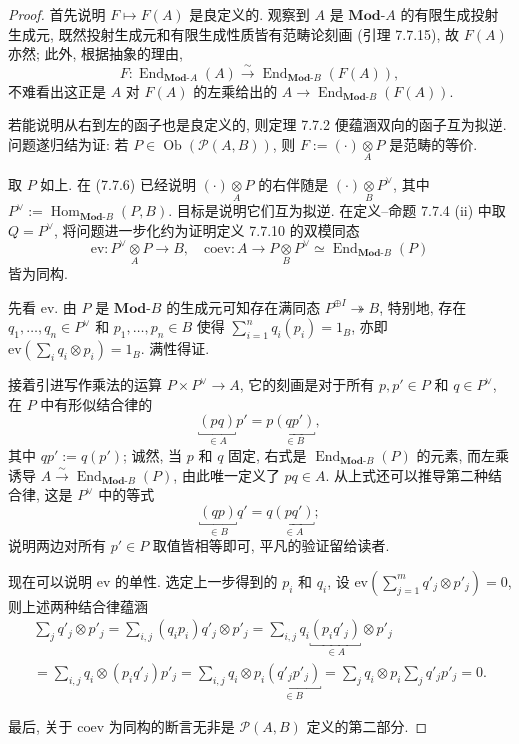 \documentclass[11pt]{article}
\newcommand{\Obj}{\operatorname{Ob}}
\newcommand{\Hom}{\operatorname{Hom}}
\newcommand{\End}{\operatorname{End}}
\newcommand{\cated}[1]{\mathbf{#1}\text{-}}
\newcommand{\dotimes}[1]{\mathbin{\mathop{\otimes}\limits_{#1}}}
\newcommand{\rightiso}{\xrightarrow{\sim}}
\theoremstyle{definition}
\begin{document}
\begin{proof}
	首先说明 $F \mapsto F(A)$ 是良定义的. 观察到 $A$ 是 $\cated{Mod}A$ 的有限生成投射生成元, 既然投射生成元和有限生成性质皆有范畴论刻画 (引理 7.7.15), 故 $F(A)$ 亦然; 此外, 根据抽象的理由,
	\[ F: \End_{\cated{Mod}A}(A) \rightiso \End_{\cated{Mod}B}(F(A)), \]
	不难看出这正是 $A$ 对 $F(A)$ 的左乘给出的 $A \to \End_{\cated{Mod}B}(F(A))$.
	
	若能说明从右到左的函子也是良定义的, 则定理 7.7.2 便蕴涵双向的函子互为拟逆. 问题遂归结为证: 若 $P \in \Obj(\mathcal{P}(A, B))$, 则 $F := (\cdot) \dotimes{A} P$ 是范畴的等价.
	
	取 $P$ 如上. 在 (7.7.6) 已经说明 $(\cdot) \dotimes{A} P$ 的右伴随是 $(\cdot) \dotimes{B} P^\vee$, 其中 $P^\vee := \Hom_{\cated{Mod}B}(P, B)$. 目标是说明它们互为拟逆. 在定义--命题 7.7.4 (ii) 中取 $Q = P^\vee$, 将问题进一步化约为证明定义 7.7.10 的双模同态
	\[ \mathrm{ev}: P^\vee \dotimes{A} P \to B, \quad \mathrm{coev}: A \to P \dotimes{B} P^\vee \simeq \End_{\cated{Mod}B}(P) \]
	皆为同构.
	
	先看 $\mathrm{ev}$. 由 $P$ 是 $\cated{Mod}B$ 的生成元可知存在满同态 $P^{\oplus I} \twoheadrightarrow B$, 特别地, 存在 $q_1, \ldots, q_n \in P^\vee$ 和 $p_1, \ldots, p_n \in B$ 使得 $\sum_{i=1}^n q_i(p_i) = 1_B$, 亦即 $\mathrm{ev}(\sum_i q_i \otimes p_i) = 1_B$. 满性得证.
	
	接着引进写作乘法的运算 $P \times P^\vee \to A$, 它的刻画是对于所有 $p, p' \in P$ 和 $q \in P^\vee$, 在 $P$ 中有形似结合律的
	\[ \underbracket{(pq)}_{\in A} p' = p \underbracket{(qp')}_{\in B}, \]
	其中 $qp' := q(p')$; 诚然, 当 $p$ 和 $q$ 固定, 右式是 $\End_{\cated{Mod}B}(P)$ 的元素, 而左乘诱导 $A \rightiso \End_{\cated{Mod}B}(P)$, 由此唯一定义了 $pq \in A$. 从上式还可以推导第二种结合律, 这是 $P^\vee$ 中的等式
	\[ \underbracket{(qp)}_{\in B} q' = q \underbracket{(pq')}_{\in A}; \]
	说明两边对所有 $p' \in P$ 取值皆相等即可, 平凡的验证留给读者.

	现在可以说明 $\mathrm{ev}$ 的单性. 选定上一步得到的 $p_i$ 和 $q_i$, 设 $\mathrm{ev}(\sum_{j=1}^m q'_j \otimes p'_j) = 0$, 则上述两种结合律蕴涵
	\begin{multline*}
		\sum_j q'_j \otimes p'_j = \sum_{i, j} (q_i p_i) q'_j \otimes p'_j
		= \sum_{i, j} q_i \underbracket{(p_i q'_j)}_{\in A} \otimes p'_j \\
		= \sum_{i, j} q_i \otimes (p_i q'_j) p'_j
		= \sum_{i, j} q_i \otimes p_i \underbracket{(q'_j p'_j)}_{\in B}
		= \sum_j q_i \otimes p_i \sum_j q'_j p'_j = 0.
	\end{multline*}

	最后, 关于 $\mathrm{coev}$ 为同构的断言无非是 $\mathcal{P}(A, B)$ 定义的第二部分.
\end{proof}
\end{document}
